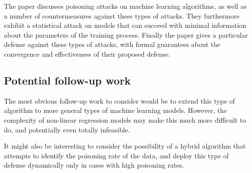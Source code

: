 \documentclass[11pt]{article}
\begin{document}
The paper discusses poisoning attacks on machine learning algorithms, as well as a number of countermeasures against these types of attacks.
They furthermore exhibit a statistical attack on models that can succeed with minimal information about the parameters of the training process.
Finally the paper gives a particular defense against these types of attacks, with formal guarantees about the convergence and effectiveness of their proposed defense.

\subsection*{Potential follow-up work}

The most obvious follow-up work to consider would be to extend this type of algorithm to more general types of machine learning models.
However, the complexity of non-linear regression models may make this much more difficult to do, and potentially even totally infeasible.

It might also be interesting to consider the possibility of a hybrid algorithm that attempts to identify the poisoning rate of the data, and deploy this type of defense dynamically only in cases with high poisoning rates.
\end{document}
